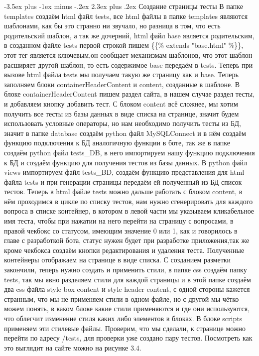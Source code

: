 \documentclass[12pt, oldlfont, amsfonts]{report}
\makeatletter
\renewcommand{\section}{\@startsection{section}{1}{0pt}%
                                {-3.5ex plus -1ex minus -.2ex}%
                                {2.3ex plus .2ex}%
{\centering\hyphenpenalty=10000\normalfont\Large\bfseries}}
\makeatother
\begin{document}
\section{Создание страницы тесты}
В папке { templates} создаём html файл {tests}, все html файлы в папке { templates} являются шаблонами, как бы это странно ни звучало, но разница в том, что есть родительский шаблон, а так же дочерний, html файл {base} является родительским, в созданном файле {tests} первой строкой пишем \{\{\% extends "base.html" \%\}\}, этот тег является ключевым,он сообщает механизмам шаблонов, что этот шаблон расширяет другой шаблон, то есть содержимое { base} передаём в { tests}. Теперь при вызове html файла {tests} мы получаем такую же страницу как и { base}. Теперь заполняем блоки { containerHeaderContent} и { content}, созданные в шаблоне. В блоке { containerHeaderContent} пишем раздел сайта, в нашем случае раздел { тесты}, и добавляем кнопку { добавить тест}. С блоком { content} всё сложнее, мы хотим получить все тесты из базы данных в виде списка на странице, значит будем использовать условные операторы, но нам необходимо получить тесты из БД, значит в папке { database} создаём python файл { MySQLConnect} и в нём создаём функцию подключения к БД аналогичную функции в боте, так же в папке создаём python файл { tests\_DB}, в него импортируем нашу функцию подключения к БД и создаём функцию для получения тестов из базы данных. В python файл { views} импортируем файл { tests\_BD}, создаём функцию представления для html файла tests и при генерации страницы передаём ей полученный из БД список тестов. Теперь в html файле {tests} можно дальше работать с блоком { content}, в нём проходимся в цикле по списку тестов, нам нужно сгенерировать для каждого вопроса в списке контейнер, в котором в левой части мы указываем кликабельное имя теста, чтобы при нажатии на него перейти на страницу с вопросами, в правой чекбокс со статусом, имеющим значение 0 или 1, как и говорилось в главе с разработкой бота, статус нужен будет при разработке приложения,так же кроме чекбокса создаём кнопки редактирования и удаления теста. Полученные контейнеры отображаем на странице в виде списка. С созданием разметки закончили, теперь нужно создать и применить стили, в папке { css} создаём папку { tests}, так мы явно разделяем стили для каждой страницы и в этой папке создаём два css файла { style box content} и { style header content}, с одной стороны кажется странным, что мы не применяем стили в одном файле, но с другой мы чётко можем понять, в каком блоке какие стили применяются и где они используются, что облегчит изменение стиля каких либо элементов в блоках. В блоке { scripts} применяем эти стилевые файлы. Проверим, что мы сделали, к странице можно перейти по адресу { /tests}, для проверки уже создано пару тестов. Посмотреть как это выглядит на сайте можно на рисунке 3.4.
\end{document}
